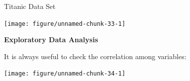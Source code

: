 \documentclass[11pt,compress,t,notes=noshow, xcolor=table]{beamer}
\newenvironment{knitrout}{}{} %
\begin{document}
\begin{vbframe}{Titanic Data Set}
\begin{knitrout}
{\centering \texttt{[image: figure/unnamed-chunk-33-1]} 

}



\end{knitrout}


\framebreak

\textbf{Exploratory Data Analysis}


It is always useful to check the correlation among variables:

\begin{knitrout}\tiny
{}\color{fgcolor}

{\centering \texttt{[image: figure/unnamed-chunk-34-1]} 

}



\end{knitrout}

\end{vbframe}

\endlecture
\end{document}
